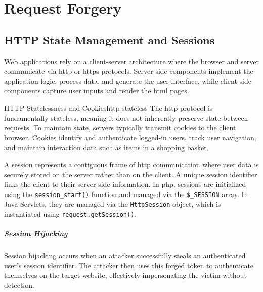 \chapter{Request Forgery}

\section{HTTP State Management and Sessions}

Web applications rely on a client-server architecture where the browser and server communicate via \gls{http} or \gls{https} protocols. Server-side components implement the application logic, process data, and generate the user interface, while client-side components capture user inputs and render the \gls{html} pages.

\begin{observation}{HTTP Statelessness and Cookies}{http-stateless}
    The \gls{http} protocol is fundamentally stateless, meaning it does not inherently preserve state between requests. To maintain state, servers typically transmit cookies to the client browser. Cookies identify and authenticate logged-in users, track user navigation, and maintain interaction data such as items in a shopping basket.
\end{observation}

A session represents a contiguous frame of \gls{http} communication where user data is securely stored on the server rather than on the client. A unique session identifier links the client to their server-side information. In \gls{php}, sessions are initialized using the \texttt{session\_start()} function and managed via the \texttt{\$\_SESSION} array. In Java Servlets, they are managed via the \texttt{HttpSession} object, which is instantiated using \texttt{request.getSession()}.

\paragraph{Session Hijacking}
Session hijacking occurs when an attacker successfully steals an authenticated user's session identifier. The attacker then uses this forged token to authenticate themselves on the target website, effectively impersonating the victim without detection.

